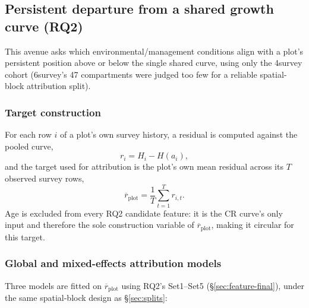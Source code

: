 \subsection{Persistent departure from a shared growth curve (RQ2)}
\label{sec:rq2}

This avenue asks which environmental/management conditions align with a plot's persistent
position above or below the single shared curve, using only the 4survey cohort (6survey's 47
compartments were judged too few for a reliable spatial-block attribution split).

\subsubsection{Target construction}
\label{sec:rq2-target}

For each row $i$ of a plot's own survey history, a residual is computed against the pooled curve,
\begin{equation}
r_i = H_i - H(a_i),
\label{eq:cr-residual}
\end{equation}
and the target used for attribution is the plot's own mean residual across its $T$ observed
survey rows,
\begin{equation}
\overline{r}_{\text{plot}} = \frac{1}{T}\sum_{t=1}^{T} r_{i,t}.
\label{eq:mean-cr-residual}
\end{equation}
Age is excluded from every RQ2 candidate feature: it is the CR curve's only input and therefore
the sole construction variable of $\overline{r}_{\text{plot}}$, making it circular for this
target.

\subsubsection{Global and mixed-effects attribution models}
\label{sec:rq2-models}

Three models are fitted on $\overline{r}_{\text{plot}}$ using RQ2's Set1--Set5
(\S\ref{sec:feature-final}), under the same spatial-block design as \S\ref{sec:splits}:

